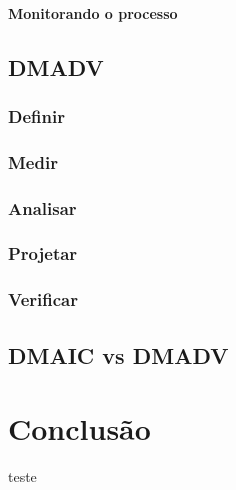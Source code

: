 \documentclass{abnt}
\begin{document}
					\subsubsection {Monitorando o processo}
			\section {DMADV}
				\subsection {Definir}
				\subsection {Medir}
				\subsection {Analisar}
				\subsection {Projetar}
				\subsection {Verificar}
			\section {DMAIC vs DMADV}
	
	\chapter {Conclusão}
	
	\begin{thebibliography}{99}
		 teste
	\end{thebibliography}
\end{document}
